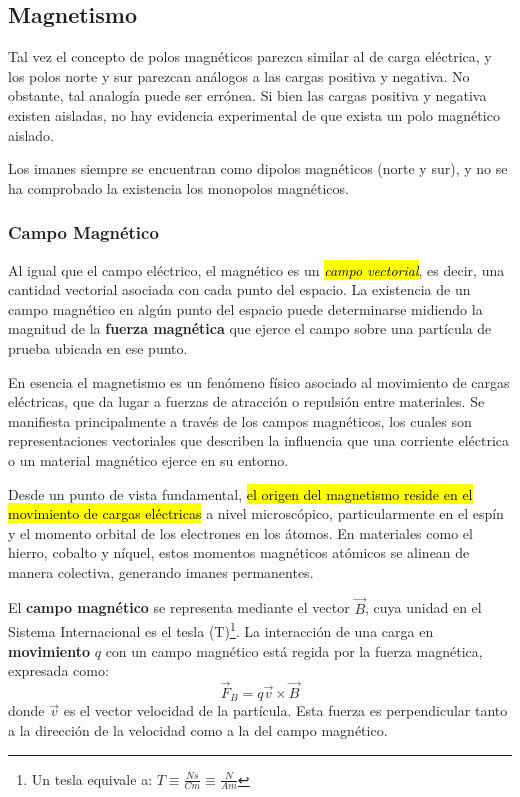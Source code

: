 \subsection{Magnetismo}

Tal vez el concepto de polos magnéticos parezca similar al de carga eléctrica, y los polos norte y sur parezcan análogos a las cargas positiva y negativa. No obstante, tal analogía puede ser errónea. Si bien las cargas positiva y negativa existen aisladas, no hay evidencia experimental de que exista un polo magnético aislado.

Los imanes siempre se encuentran como dipolos magnéticos (norte y sur), y no se ha comprobado la existencia los monopolos magnéticos.

\subsubsection{Campo Magnético}

Al igual que el campo eléctrico, el magnético es un \hl{\textit{campo vectorial}}, es decir, una cantidad vectorial asociada con cada punto del espacio. La existencia de un campo magnético en algún punto del espacio puede determinarse midiendo la magnitud de la \textbf{fuerza magnética} que ejerce el campo sobre una partícula de prueba ubicada en ese punto.

En esencia el magnetismo es un fenómeno físico asociado al movimiento de cargas eléctricas, que da lugar a fuerzas de atracción o repulsión entre materiales. Se manifiesta principalmente a través de los campos magnéticos, los cuales son representaciones vectoriales que describen la influencia que una corriente eléctrica o un material magnético ejerce en su entorno.

Desde un punto de vista fundamental, \hl{el origen del magnetismo reside en el movimiento de cargas eléctricas} a nivel microscópico, particularmente en el espín y el momento orbital de los electrones en los átomos. En materiales como el hierro, cobalto y níquel, estos momentos magnéticos atómicos se alinean de manera colectiva, generando imanes permanentes.

El \textbf{campo magnético} se representa mediante el vector \(\vec{B}\), cuya unidad en el Sistema Internacional es el tesla (T)\footnote{Un tesla equivale a: \(T \equiv \frac{Ns}{Cm} \equiv \frac{N}{Am}\)}. La interacción de una carga en \textbf{movimiento} \(q\) con un campo magnético está regida por la fuerza magnética, expresada como:
\begin{equation}
  \vec{F}_B = q\vec{v} \times \vec{B}
  \label{eq:fuerza_magnética}
\end{equation}
donde \(\vec{v}\) es el vector velocidad de la partícula. Esta fuerza es perpendicular tanto a la dirección de la velocidad como a la del campo magnético.


